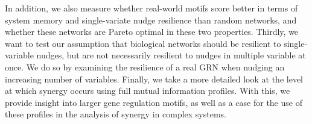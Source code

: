 \documentclass[../main.tex]{subfiles}
\begin{document}
In addition, we also measure whether real-world motifs score better in terms of system memory and single-variate nudge resilience than random networks, and whether these networks are Pareto optimal in these two properties.
Thirdly, we want to test our assumption that biological networks should be resilient to single-variable nudges, but are not necessarily resilient to nudges in multiple variable at once.
We do so by examining the resilience of a real GRN when nudging an increasing number of variables.
Finally, we take a more detailed look at the level at which synergy occurs using full mutual information profiles.
With this, we provide insight into larger gene regulation motifs, as well as a case for the use of these profiles in the analysis of synergy in complex systems.
\end{document}
